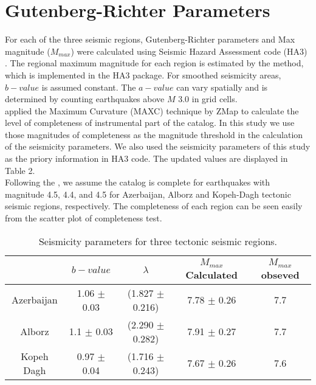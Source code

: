 \section{ Gutenberg-Richter Parameters}
For each of the three seismic regions, Gutenberg-Richter parameters and Max magnitude ($M_{max}$) were calculated using Seismic Hazard Assessment code (HA3) \citep{kijko2004}. The regional maximum magnitude for each region is estimated by the \citet{Kijko1989} method, which is implemented in the HA3 package. For smoothed seismicity areas, $b-value$ is assumed constant. The $a-value$ can vary spatially and is determined by counting earthquakes above $M$ 3.0 in grid cells.\\
\noindent
\citet{Karimiparidari2013} applied the Maximum Curvature (MAXC) technique \citep{Wyss1999, Wiemer2000} by ZMap \citep{Wiemer2001} to calculate the level of completeness of instrumental part of the catalog. In this study we use those magnitudes of completeness as the magnitude threshold in the calculation of the seismicity parameters. We also used the seismicity parameters of this study \citep{Karimiparidari2013} as the priory information in HA3 code. The updated values are displayed in Table 2. \\
\noindent
Following the \citet{Karimiparidari2013}, we assume the catalog is complete for earthquakes with magnitude 4.5, 4.4, and 4.5 for Azerbaijan, Alborz and Kopeh-Dagh tectonic seismic regions, respectively. The completeness of each region can be seen easily from the scatter plot of completeness test. 

\begin{table}[h]
\centering
\caption{Seismicity parameters for three tectonic seismic regions.}
    \begin{tabular}{ccccc}
    ~                   & $b-value$            & $\lambda$                  & $M_{max}$ Calculated & $M_{max}$ obseved \\ \hline
    Azerbaijan    & 1.06 $\pm$ 0.03  & (1.827  $\pm$ 0.216) & 7.78  $\pm$ 0.26           & 7.7          \\ \hline
    Alborz           & 1.1  $\pm$ 0.03   & (2.290  $\pm$ 0.282) & 7.91  $\pm$ 0.27           & 7.7          \\ \hline
    Kopeh Dagh & 0.97  $\pm$ 0.04 & (1.716  $\pm$ 0.243) & 7.67  $\pm$ 0.26           & 7.6          \\
    \end{tabular}
  
\end{table}

